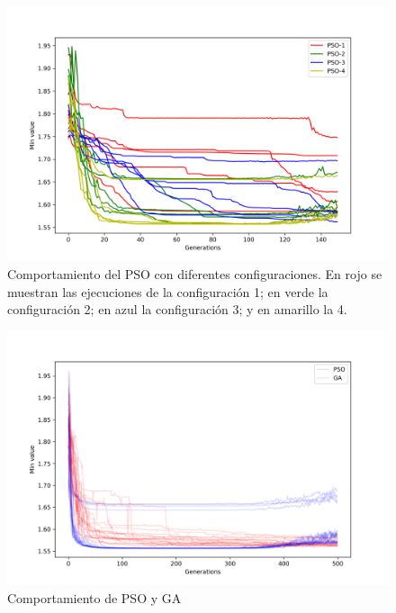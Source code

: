 \documentclass[letterpaper]{report}
\begin{document}
    \begin{figure}[ht!]
      \centering
      \includegraphics[width=\textwidth]{params-search-lines.png}
      \caption{
        Comportamiento del PSO con diferentes configuraciones. En rojo se
        muestran las ejecuciones de la configuración 1; en verde la
        configuración 2; en azul la configuración 3; y en amarillo la 4.
      }
      \label{fig:params-search-lines}
    \end{figure}

    \begin{figure}[ht!]
      \centering
      \includegraphics[width=\textwidth]{average-results.png}
      \caption{Comportamiento de PSO y GA}
      \label{fig:average-results}
    \end{figure}
\end{document}
